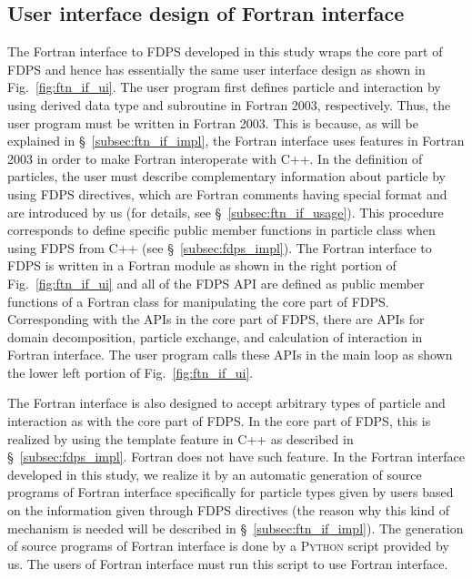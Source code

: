 \documentclass[twocolumn,useamsfonts]{pasj01}
\begin{document}
\subsection{User interface design of Fortran interface}
\label{subsec:ftn_if_ui}
The Fortran interface to FDPS developed in this study wraps the core part of FDPS and hence has essentially the same user interface design as shown in Fig.~\ref{fig:ftn_if_ui}. The user program first defines particle and interaction by using derived data type and subroutine in Fortran 2003, respectively. Thus, the user program must be written in Fortran 2003. This is because, as will be explained in \S~\ref{subsec:ftn_if_impl}, the Fortran interface uses features in Fortran 2003 in order to make Fortran interoperate with C++. In the definition of particles, the user must describe complementary information about particle by using FDPS directives, which are Fortran comments having special format and are introduced by us (for details, see \S~\ref{subsec:ftn_if_usage}). This procedure corresponds to define specific public member functions in particle class when using FDPS from C++ (see \S~\ref{subsec:fdps_impl}). The Fortran interface to FDPS is written in a Fortran module as shown in the right portion of Fig.~\ref{fig:ftn_if_ui} and all of the FDPS API are defined as public member functions of a Fortran class for manipulating the core part of FDPS. Corresponding with the APIs in the core part of FDPS, there are APIs for domain decomposition, particle exchange, and calculation of interaction in Fortran interface. The user program calls these APIs in the main loop as shown the lower left portion of Fig.~\ref{fig:ftn_if_ui}.

The Fortran interface is also designed to accept arbitrary types of particle and interaction as with the core part of FDPS. In the core part of FDPS, this is realized by using the template feature in C++ as described in \S~\ref{subsec:fdps_impl}. Fortran does not have such feature. In the Fortran interface developed in this study, we realize it by an automatic generation of source programs of Fortran interface specifically for particle types given by users based on the information given through FDPS directives (the reason why this kind of mechanism is needed will be described in \S~\ref{subsec:ftn_if_impl}). The generation of source programs of Fortran interface is done by a \textsc{Python} script provided by us. The users of Fortran interface must run this script to use Fortran interface.
\end{document}
